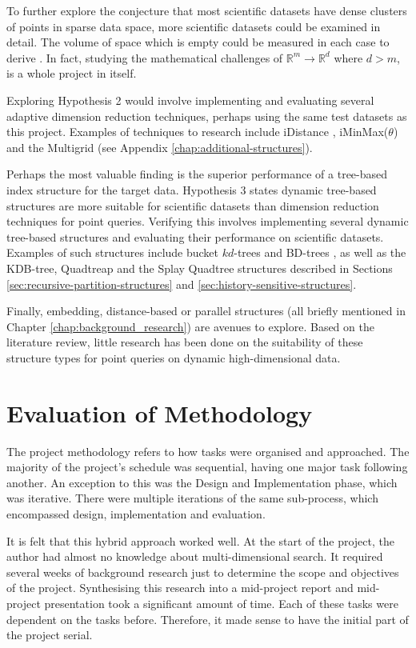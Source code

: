 To further explore the conjecture that most scientific datasets have dense clusters of points in sparse data space, more scientific datasets could be examined in detail. The volume of space which is empty could be measured in each case to derive . In fact, studying the mathematical challenges of $\mathbb{R}^m \rightarrow \mathbb{R}^d$ where $d > m$, is a whole project in itself.

Exploring Hypothesis 2 would involve implementing and evaluating several adaptive dimension reduction techniques, perhaps using the same test datasets as this project. Examples of techniques to research include iDistance \cite{idistance}, iMinMax($\theta$) and the Multigrid (see Appendix \ref{chap:additional-structures}).

Perhaps the most valuable finding is the superior performance of a tree-based index structure for the target data. Hypothesis 3 states dynamic tree-based structures are more suitable for scientific datasets than dimension reduction techniques for point queries. Verifying this involves implementing several dynamic tree-based structures and evaluating their performance on scientific datasets. Examples of such structures include bucket $kd$-trees and BD-trees \cite{kdtree-v-bdtree}, as well as the KDB-tree, Quadtreap and the Splay Quadtree structures described in Sections \ref{sec:recursive-partition-structures} and \ref{sec:history-sensitive-structures}.

Finally, embedding, distance-based or parallel structures (all briefly mentioned in Chapter \ref{chap:background_research}) are avenues to explore. Based on the literature review, little research has been done on the suitability of these structure types for point queries on dynamic high-dimensional data.

\section{Evaluation of Methodology}

The project methodology refers to how tasks were organised and approached. The majority of the project's schedule was sequential, having one major task following another. An exception to this was the Design and Implementation phase, which was iterative. There were multiple iterations of the same sub-process, which encompassed design, implementation and evaluation. 

It is felt that this hybrid approach worked well. At the start of the project, the author had almost no knowledge about multi-dimensional search. It required several weeks of background research just to determine the scope and objectives of the project. Synthesising this research into a mid-project report and mid-project presentation took a significant amount of time. Each of these tasks were dependent on the tasks before. Therefore, it made sense to have the initial part of the project serial.

